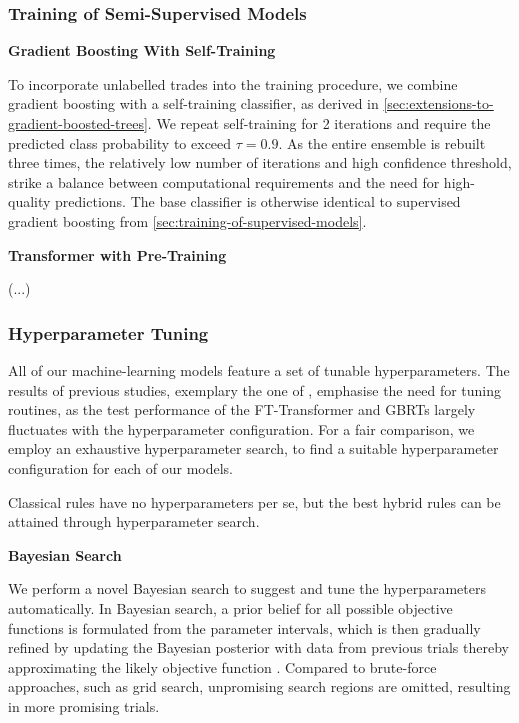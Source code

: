 \subsubsection{Training of Semi-Supervised
    Models}\label{sec:training-of-semi-supervised-models}

\textbf{Gradient Boosting With Self-Training}

To incorporate unlabelled trades into the training procedure, we combine gradient boosting with a self-training classifier, as derived in \cref{sec:extensions-to-gradient-boosted-trees}. We repeat self-training for 2 iterations and require the predicted class probability to exceed $\tau=0.9$. As the entire ensemble is rebuilt three times, the relatively low number of iterations and high confidence threshold, strike a balance between computational requirements and the need for high-quality predictions. The base classifier is otherwise identical to supervised gradient boosting from \cref{sec:training-of-supervised-models}.

\textbf{Transformer with Pre-Training}

(...)

\subsubsection{Hyperparameter Tuning}\label{sec:hyperparameter-tuning}

All of our machine-learning models feature a set of tunable hyperparameters. The results of previous studies, exemplary the one of \textcite[][5]{grinsztajnWhyTreebasedModels2022}, emphasise the need for tuning routines, as the test performance of the FT-Transformer and \glspl{GBRT} largely fluctuates with the hyperparameter configuration. For a fair comparison, we employ an exhaustive hyperparameter search, to find a suitable hyperparameter configuration for each of our models.

Classical rules have no hyperparameters per se, but the best hybrid rules can be attained through hyperparameter search.

\textbf{Bayesian Search}

We perform a novel Bayesian search to suggest and tune the hyperparameters automatically. In Bayesian search, a prior belief for all possible objective functions is formulated from the parameter intervals, which is then gradually refined by updating the Bayesian posterior with data from previous trials thereby approximating the likely objective function \autocite[][2]{shahriariTakingHumanOut2016}. Compared to brute-force approaches, such as grid search, unpromising search regions are omitted, resulting in more promising trials.

